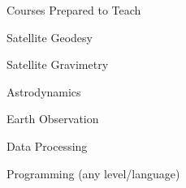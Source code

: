 
\begin{cvtext}{Courses Prepared to Teach}
  \begin{itti}
    \item Satellite Geodesy
    \item Satellite Gravimetry
    \item Astrodynamics
    \item Earth Observation
    \item Data Processing
    \item Programming (any level\slash language)
  \end{itti}
\end{cvtext}


